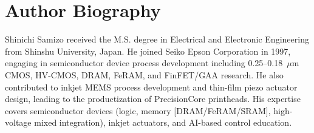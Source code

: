 \documentclass[conference]{IEEEtran}
\begin{document}
\clearpage
\section*{Author Biography}
Shinichi Samizo received the M.S. degree in Electrical and Electronic Engineering from Shinshu University, Japan. He joined Seiko Epson Corporation in 1997, engaging in semiconductor device process development including 0.25--0.18~$\mu$m CMOS, HV-CMOS, DRAM, FeRAM, and FinFET/GAA research. He also contributed to inkjet MEMS process development and thin-film piezo actuator design, leading to the productization of PrecisionCore printheads. His expertise covers semiconductor devices (logic, memory [DRAM/FeRAM/SRAM], high-voltage mixed integration), inkjet actuators, and AI-based control education.
\end{document}
